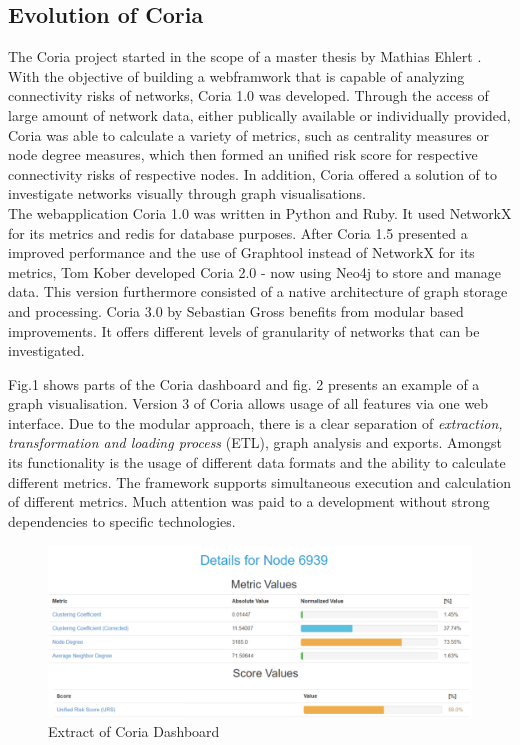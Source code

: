 \documentclass[conference, 11pt]{IEEEtran}
\begin{document}
\subsection{Evolution of Coria}
The Coria project started in the scope of a master thesis by Mathias Ehlert \cite{Ehlert}. With the objective of building a webframwork that is capable of analyzing connectivity risks of networks, Coria 1.0 was developed. Through the access of large amount of network data, either publically available or individually provided, Coria was able to calculate a variety of metrics, such as  
centrality measures or node degree measures, which then formed an unified risk score for respective connectivity risks of respective nodes. In addition, Coria offered a solution of to investigate networks visually through graph visualisations. \\ \linebreak 
 The webapplication Coria 1.0 was written in Python and Ruby. It used NetworkX for its metrics and redis for database purposes. After Coria 1.5 presented a improved performance and the use of Graphtool instead of NetworkX for its metrics, Tom Kober developed Coria 2.0 - now using Neo4j to store and manage data. This version furthermore consisted of a native architecture of graph storage and processing\cite{Coria2}. Coria 3.0 by Sebastian Gross benefits from modular based improvements. It offers different levels of granularity of networks that can be investigated. \linebreak

Fig.1 shows parts of the Coria dashboard and fig. 2 presents an example of a graph visualisation. Version 3 of Coria allows usage of all features via one web interface. Due to the modular approach, there is a clear separation of \textit{extraction, transformation and loading process} (ETL), graph analysis and exports. Amongst its functionality is the usage of different data formats and the ability to calculate different metrics. The framework supports simultaneous execution and calculation of different metrics. Much attention was paid to a development without strong dependencies to specific technologies\cite{Coria3}. \\ \linebreak
 
 \begin{figure}[htbp]
\centerline{\includegraphics[scale=0.39]{Graphics/CoriaExtract.PNG}}
\caption{Extract of Coria Dashboard}
\label{fig}
\end{figure} 
\end{document}
